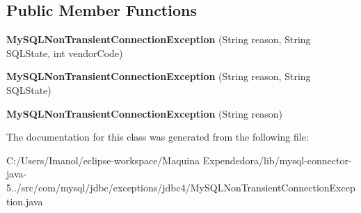 \subsection*{Public Member Functions}
\begin{DoxyCompactItemize}
\item 
\mbox{\label{classcom_1_1mysql_1_1jdbc_1_1exceptions_1_1jdbc4_1_1_my_s_q_l_non_transient_connection_exception_aa7dfe84d77ad3802b75f1f1a87bb0b03}} 
{\bfseries My\+S\+Q\+L\+Non\+Transient\+Connection\+Exception} (String reason, String S\+Q\+L\+State, int vendor\+Code)
\item 
\mbox{\label{classcom_1_1mysql_1_1jdbc_1_1exceptions_1_1jdbc4_1_1_my_s_q_l_non_transient_connection_exception_af89a474f02531612843db45e5b32af5e}} 
{\bfseries My\+S\+Q\+L\+Non\+Transient\+Connection\+Exception} (String reason, String S\+Q\+L\+State)
\item 
\mbox{\label{classcom_1_1mysql_1_1jdbc_1_1exceptions_1_1jdbc4_1_1_my_s_q_l_non_transient_connection_exception_a18467fc2a6f3cd1878fbcd2ab97bfa45}} 
{\bfseries My\+S\+Q\+L\+Non\+Transient\+Connection\+Exception} (String reason)
\end{DoxyCompactItemize}


The documentation for this class was generated from the following file\+:\begin{DoxyCompactItemize}
\item 
C\+:/\+Users/\+Imanol/eclipse-\/workspace/\+Maquina Expendedora/lib/mysql-\/connector-\/java-\/5../src/com/mysql/jdbc/exceptions/jdbc4/My\+S\+Q\+L\+Non\+Transient\+Connection\+Exception.\+java\end{DoxyCompactItemize}

